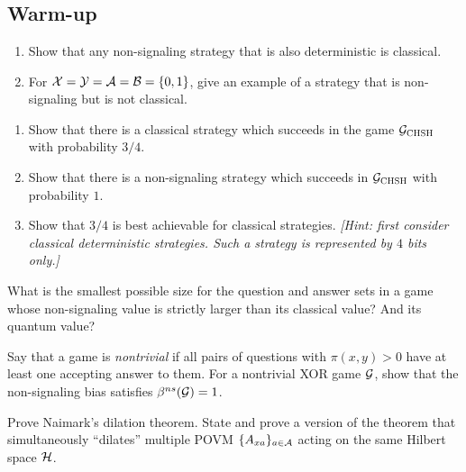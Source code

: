 \chapter{}


\section{Warm-up}

\begin{exercise}
\begin{enumerate}
\item Show that any non-signaling strategy that is also deterministic is classical.
\item For $\mathcal{X}=\mathcal{Y}=\mathcal{A}=\mathcal{B}=\{0,1\}$, give an example of a strategy that is non-signaling but is not classical. 
\end{enumerate}
\end{exercise}

\begin{exercise}
\begin{enumerate}
\item Show that there is a classical strategy which succeeds in the game $\mathcal{G}_{\textsc{CHSH}}$ with probability $3/4$.
\item Show that there is a non-signaling strategy which succeeds in $\mathcal{G}_{\textsc{CHSH}}$ with probability $1$.  
\item Show that $3/4$ is best achievable for classical strategies. \emph{[Hint: first consider classical deterministic strategies. Such a strategy is represented by $4$ bits only.]}
\end{enumerate}
\end{exercise}

\begin{exercise}
What is the smallest possible size for the question and answer sets in a game whose non-signaling value is strictly larger than its classical value? And its quantum value? 
\end{exercise}

\begin{exercise}
Say that a game is \emph{nontrivial} if all pairs of questions with $\pi(x,y)>0$ have at least one accepting answer to them. For a nontrivial XOR game $\mathcal{G}$, show that the non-signaling bias satisfies $\beta^{ns}(\mathcal{G})=1$.
\end{exercise}

\begin{exercise}
Prove Naimark's dilation theorem. State and prove a version of the theorem that simultaneously ``dilates'' multiple POVM $\{A_{xa}\}_{a\in\mathcal{A}}$ acting on the same Hilbert space $\mathcal{H}$.
\end{exercise}


